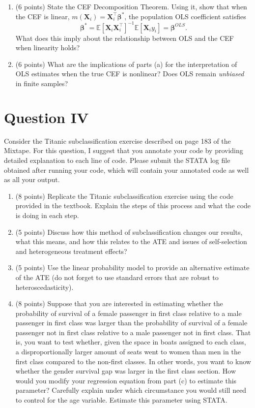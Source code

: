 \documentclass[letterpaper,12pt]{article}
\begin{document}
\begin{enumerate}[label=(\alph*)]

\item (6 points) State the CEF Decomposition Theorem. Using it, show that when the CEF is linear, $m(\mathbf{X}_i)=\mathbf{X}_i^\top\boldsymbol{\beta}^*$, the population OLS coefficient satisfies
\[
\boldsymbol{\beta}^* = \mathbb{E}[\mathbf{X}_i\mathbf{X}_i^\top]^{-1}\mathbb{E}[\mathbf{X}_i y_i] = \boldsymbol{\beta}^{OLS}.
\]
What does this imply about the relationship between OLS and the CEF when linearity holds?

\item (6 points) What are the implications of parts (a) for the interpretation of OLS estimates when the true CEF is nonlinear? Does OLS remain \textit{unbiased} in finite samples?

\end{enumerate}


\section*{Question IV}
Consider the Titanic subclassification exercise described on page 183 of the Mixtape. For this question, I suggest that you annotate your code by providing detailed explanation to each line of code. Please submit the STATA log file obtained after running your code, which will contain your annotated code as well as all your output.
\begin{enumerate}[label=(\alph*)] 
\item (8 points) Replicate the Titanic subclassification exercise using the code provided in the textbook. Explain the steps of this process and what the code is doing in each step.
\item (5 points)  Discuss how this method of subclassification changes our results, what this means, and how this relates to the ATE and issues of self-selection and heterogeneous treatment effects?
\item (5 points) Use the linear probability model to provide an alternative estimate of the ATE (do not forget to use standard errors that are robust to heteroscedasticity).
\item (8 points) Suppose that you are interested in estimating whether the probability of survival of a female passenger in first class relative to a male passenger in first class was larger than the probability of survival of a female passenger not in first class relative to a male passenger not in first class. That is, you want to test whether, given the space in boats assigned to each class, a disproportionally larger amount of seats went to women than men in the first class compared to the non-first classes. In other words, you want to know whether the gender survival gap was larger in the first class section. How would you modify your regression equation from part (c) to estimate this parameter? Carefully explain under which circumstance you would still need to control for the age variable. Estimate this parameter using STATA.     

\end{enumerate}
\end{document}

